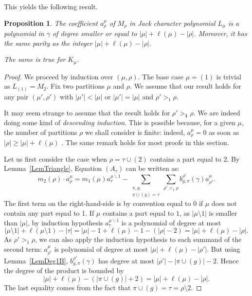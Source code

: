 \documentclass[11pt]{amsart}
\theoremstyle{plain}
\newtheorem{proposition}[lemma]{Proposition}
\theoremstyle{remark}
\begin{document}
This yields the following result.
\begin{proposition}\label{PropBound1}
    The coefficient $a^\mu_\rho$ of $M_\rho$ in
    Jack character polynomial $L_\mu$ is a polynomial in $\gamma$
    of degree smaller or equal to $|\mu|+\ell(\mu) - |\rho|$.
    Moreover, it has the same parity as the integer  $|\mu|+\ell(\mu) - |\rho|$.

    The same is true for $K_\mu$.
\end{proposition}
\begin{proof}
    We proceed by induction over $(\mu,\rho)$.
    The base case $\mu=(1)$ is trivial as $L_{(1)}=M_2$.
    Fix two partitions $\mu$ and $\rho$.
    We assume that our result holds for any pair $(\mu',\rho')$
    with $|\mu'| < |\mu|$ or $|\mu'|=|\mu|$ and $\rho' >_1 \rho$.

    It may seem strange to assume that the result holds for $\rho' \bm{>_1} \rho$.
    We are indeed doing some kind of {\em descending induction}.
    This is possible because, for a given $\mu$, the number of partitions $\rho$
    we shall consider is finite:
    indeed, $a^\mu_\rho=0$ as soon as $|\rho| \geq |\mu|+\ell(\mu)$ 
    \cite[Proposition 9.2 (ii)]{Lassalle2009}.
    The same remark holds for most proofs in this section.

    Let us first consider the case when $\rho=\tau \cup (2)$ contains a part equal to 2.
    By Lemma~\ref{LemTriangle}, Equation $(A_\tau)$ can be written as:
    \[ m_2(\rho) \cdot a^\mu_\rho = m_1(\mu) a^{\mu \backslash 1}_{\tau} 
    - \sum_{\substack{\pi,g, \\ \pi \cup (g) = \tau}} \sum_{\rho' >_1 \rho}
    b_{g,\pi}^{\rho'}(\gamma) a^\mu_{\rho'}.\]
    The first term on the right-hand-side is by convention equal to 0 if $\mu$ does not contain any part equal to 1.
    If $\mu$ contains a part equal to $1$, as $|\mu \setminus 1|$ is smaller than $|\mu|$,
    by induction hypothesis $a^{\mu \backslash 1}_{\tau}$ is a polynomial of degree at most
    \[|\mu \setminus 1| + \ell(\mu \setminus 1) - |\tau| = 
    |\mu|-1 + \ell(\mu)-1-(|\rho|-2)=|\mu|+\ell(\mu) - |\rho|.\]
    As $\rho' >_1 \rho$, 
    we can also apply the induction hypothesis to each summand 
    of the second term: $a^\mu_{\rho'}$ is  polynomial of degree at most
    $|\mu|+\ell(\mu)-|\rho'|$.
    But using Lemma~\ref{LemDeg1B}, $b_{g,\pi}^{\rho'}(\gamma)$ has degree at most
    $|\rho'|-|\pi \cup (g)|-2$.
    Hence the degree of the product is bounded by
    \[|\mu|+\ell(\mu) - (|\pi \cup (g)|+2) = |\mu|+\ell(\mu) - |\rho|.\]
    The last equality comes from the fact that $\pi \cup (g)=\tau=\rho \setminus 2$.


\end{proof}
\end{document}

